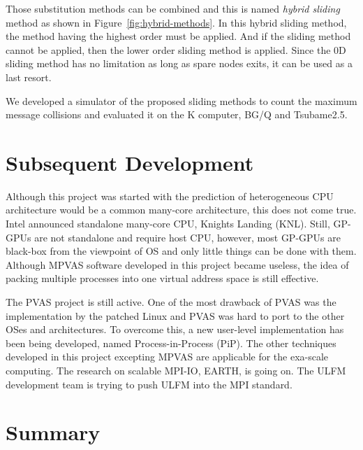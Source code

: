 Those substitution methods can be combined and this is named {\em
hybrid sliding} method as shown in Figure~\ref{fig:hybrid-methods}. In
this hybrid sliding method, the method having the highest order must
be applied. And if the sliding method cannot be applied, then the
lower order sliding method is applied. Since the 0D sliding method has no
limitation as long as spare nodes exits, it can be used as a last resort.

We developed a simulator of the proposed sliding methods to count the 
maximum message collisions and evaluated it on the K computer, BG/Q
and Tsubame2.5\cite{Hori:2015:SSF:2802658.2802670}. 

\section{Subsequent Development}

Although this project was started with the prediction of
heterogeneous CPU architecture would be a common many-core
architecture, this does not come true. Intel announced standalone
many-core CPU, Knights Landing (KNL). Still, GP-GPUs are not
standalone and require host CPU, however, most GP-GPUs are black-box
from the viewpoint of OS and only little things can be done with
them. Although MPVAS software developed in this project became
useless, the idea of packing multiple processes into one virtual
address space is still effective.

The PVAS project is still active. One of the most drawback of PVAS was
the implementation by the patched Linux and PVAS was hard to port to the
other OSes and architectures. To overcome this, a new
user-level implementation has been being developed, named
Process-in-Process (PiP). 
The other techniques developed in this project excepting MPVAS are
applicable for the exa-scale computing. The research on scalable
MPI-IO, EARTH, is going on. The ULFM development team is
trying to push ULFM into the MPI standard.

\section{Summary}
